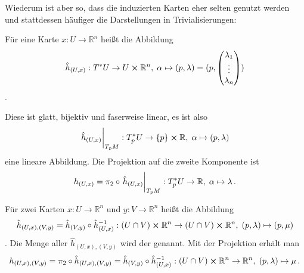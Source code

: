 \documentclass[../H_Analysis_main.tex]{subfiles}
\begin{document}
Wiederum ist aber so, dass die induzierten Karten eher selten genutzt werden und stattdessen häufiger die Darstellungen in Trivialisierungen:
\begin{defi}
Für eine Karte $x: U \rightarrow \mathbb{R}^n$ heißt die Abbildung
\begin{equation}
\hat{h}_{(U, x)}: T^* U \rightarrow U \cross \mathbb{R}^n, \; \alpha \mapsto (p, \lambda) = (p, \mqty(\lambda_1 \\ \vdots \\ \lambda_n))
\end{equation}
.

Diese ist glatt, bijektiv und faserweise linear, es ist also
\begin{equation}
\eval{\hat{h}_{(U, x)}}_{T_p M}: T^*_p U \rightarrow \qty{p} \cross \mathbb{R}, \; \alpha \mapsto (p, \lambda)
\end{equation}
eine lineare Abbildung. Die Projektion auf die zweite Komponente ist
\begin{equation}
h_{(U, x)} = \pi_2 \circ \eval{\hat{h}_{(U, x)}}_{T_p M}: T^*_p U \rightarrow \mathbb{R}, \; \alpha \mapsto \lambda \, .
\end{equation}


Für zwei Karten $x: U \rightarrow \mathbb{R}^n$ und $y: V \rightarrow \mathbb{R}^n$ heißt die Abbildung
\begin{equation}
\hat{h}_{(U, x), (V, y)} = \hat{h}_{(V, y)} \circ \hat{h}_{(U, x)}^{-1}: (U \cap V) \cross \mathbb{R}^n \rightarrow (U \cap V) \cross \mathbb{R}^n, \; (p, \lambda) \mapsto (p, \mu)
\end{equation}
. Die Menge aller $\hat{h}_{(U, x), (V, y)}$ wird der  genannt. Mit der Projektion erhält man
\begin{equation}
h_{(U, x), (V, y)} = \pi_2 \circ \hat{h}_{(U, x), (V, y)} = \hat{h}_{(V, y)} \circ \hat{h}_{(U, x)}^{-1}: (U \cap V) \cross \mathbb{R}^n \rightarrow \mathbb{R}^n, \; (p, \lambda) \mapsto \mu \, .
\end{equation}
\end{defi}
\end{document}
